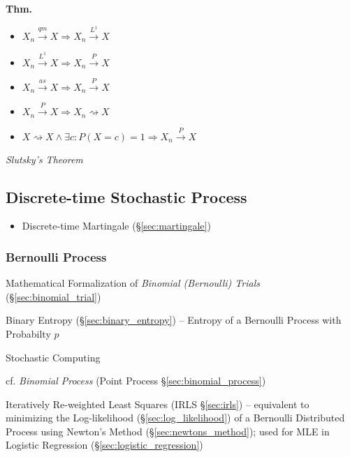 \textbf{Thm.}
\begin{itemize}
  \item $X_n \xrightarrow{qm} X \Rightarrow X_n \xrightarrow{L^1} X$
  \item $X_n \xrightarrow{L^1} X \Rightarrow X_n \xrightarrow{P} X$
  \item $X_n \xrightarrow{as} X \Rightarrow X_n \xrightarrow{P} X$
  \item $X_n \xrightarrow{P} X \Rightarrow X_n \rightsquigarrow X$
  \item $X \rightsquigarrow X \wedge \exists c : P(X = c) = 1 \Rightarrow
    X_n \xrightarrow{P} X$
\end{itemize}

\emph{Slutsky's Theorem}



\subsection{Discrete-time Stochastic Process}\label{sec:discretetime_stochastic}

\begin{itemize}
  \item Discrete-time Martingale (\S\ref{sec:martingale})
\end{itemize}



\subsubsection{Bernoulli Process}\label{sec:bernoulli_process}

Mathematical Formalization of \emph{Binomial (Bernoulli) Trials}
(\S\ref{sec:binomial_trial})

Binary Entropy (\S\ref{sec:binary_entropy}) -- Entropy of a Bernoulli Process
with Probabilty $p$

Stochastic Computing

cf. \emph{Binomial Process} (Point Process \S\ref{sec:binomial_process})

Iteratively Re-weighted Least Squares (IRLS \S\ref{sec:irls}) -- equivalent to
minimizing the Log-likelihood (\S\ref{sec:log_likelihood}) of a Bernoulli
Distributed Process using Newton's Method (\S\ref{sec:newtons_method}); used for
MLE in Logistic Regression (\S\ref{sec:logistic_regression})




